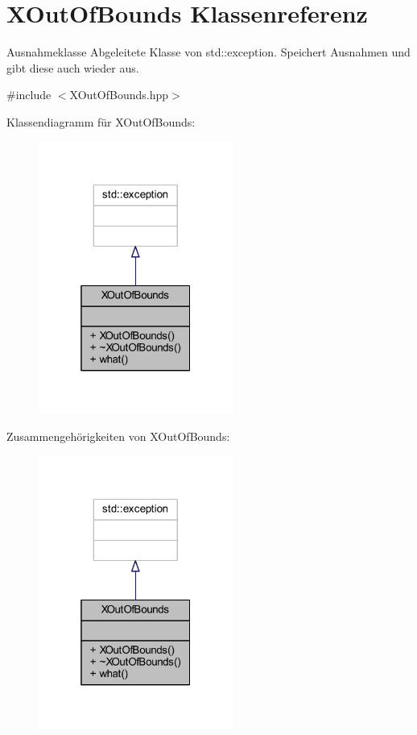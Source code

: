 \hypertarget{class_x_out_of_bounds}{}\section{X\+Out\+Of\+Bounds Klassenreferenz}
\label{class_x_out_of_bounds}


Ausnahmeklasse Abgeleitete Klasse von std\+::exception. Speichert Ausnahmen und gibt diese auch wieder aus.  




{\ttfamily \#include $<$X\+Out\+Of\+Bounds.\+hpp$>$}



Klassendiagramm für X\+Out\+Of\+Bounds\+:
\nopagebreak
\begin{figure}[H]
\begin{center}
\leavevmode
\includegraphics[width=181pt]{class_x_out_of_bounds__inherit__graph}
\end{center}
\end{figure}


Zusammengehörigkeiten von X\+Out\+Of\+Bounds\+:
\nopagebreak
\begin{figure}[H]
\begin{center}
\leavevmode
\includegraphics[width=181pt]{class_x_out_of_bounds__coll__graph}
\end{center}
\end{figure}

